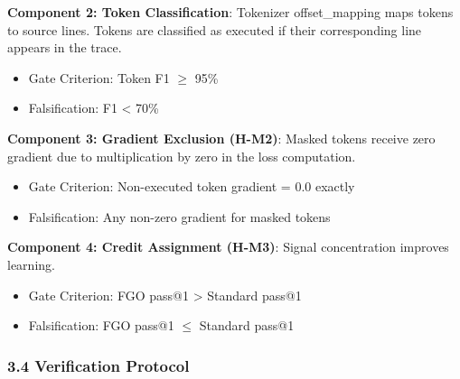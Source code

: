 \textbf{Component 2: Token Classification}: Tokenizer offset\_mapping maps tokens to source lines. Tokens are classified as executed if their corresponding line appears in the trace.

\begin{itemize}
\item Gate Criterion: Token F1 $\geq$ 95\%
\item Falsification: F1 < 70\%
\end{itemize}

\textbf{Component 3: Gradient Exclusion (H-M2)}: Masked tokens receive zero gradient due to multiplication by zero in the loss computation.

\begin{itemize}
\item Gate Criterion: Non-executed token gradient = 0.0 exactly
\item Falsification: Any non-zero gradient for masked tokens
\end{itemize}

\textbf{Component 4: Credit Assignment (H-M3)}: Signal concentration improves learning.

\begin{itemize}
\item Gate Criterion: FGO pass@1 > Standard pass@1
\item Falsification: FGO pass@1 $\leq$ Standard pass@1
\end{itemize}

\subsubsection{3.4 Verification Protocol}

\begin{table}[htbp]
\centering
{}
\end{table}
